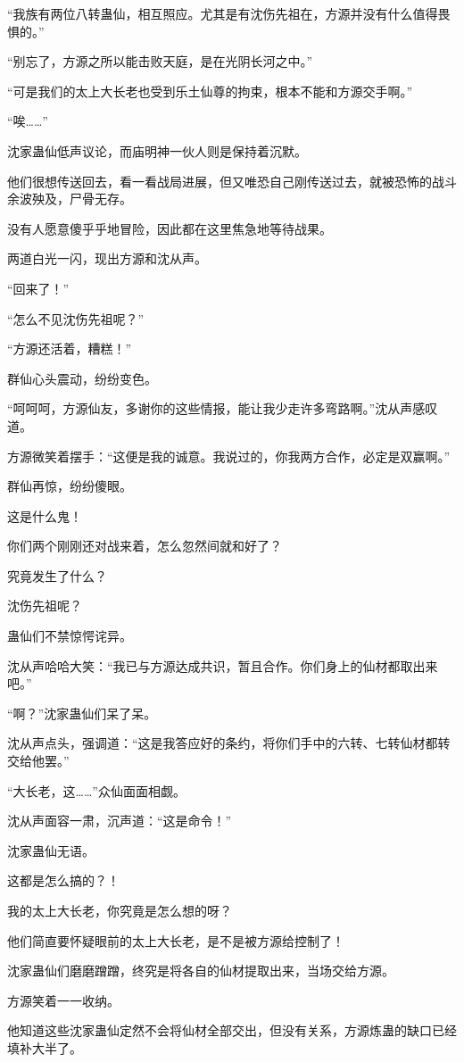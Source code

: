 \begin{this_body}
“我族有两位八转蛊仙，相互照应。尤其是有沈伤先祖在，方源并没有什么值得畏惧的。”

“别忘了，方源之所以能击败天庭，是在光阴长河之中。”

“可是我们的太上大长老也受到乐土仙尊的拘束，根本不能和方源交手啊。”

“唉……”

沈家蛊仙低声议论，而庙明神一伙人则是保持着沉默。

他们很想传送回去，看一看战局进展，但又唯恐自己刚传送过去，就被恐怖的战斗余波殃及，尸骨无存。

没有人愿意傻乎乎地冒险，因此都在这里焦急地等待战果。

两道白光一闪，现出方源和沈从声。

“回来了！”

“怎么不见沈伤先祖呢？”

“方源还活着，糟糕！”

群仙心头震动，纷纷变色。

“呵呵呵，方源仙友，多谢你的这些情报，能让我少走许多弯路啊。”沈从声感叹道。

方源微笑着摆手：“这便是我的诚意。我说过的，你我两方合作，必定是双赢啊。”

群仙再惊，纷纷傻眼。

这是什么鬼！

你们两个刚刚还对战来着，怎么忽然间就和好了？

究竟发生了什么？

沈伤先祖呢？

蛊仙们不禁惊愕诧异。

沈从声哈哈大笑：“我已与方源达成共识，暂且合作。你们身上的仙材都取出来吧。”

“啊？”沈家蛊仙们呆了呆。

沈从声点头，强调道：“这是我答应好的条约，将你们手中的六转、七转仙材都转交给他罢。”

“大长老，这……”众仙面面相觑。

沈从声面容一肃，沉声道：“这是命令！”

沈家蛊仙无语。

这都是怎么搞的？！

我的太上大长老，你究竟是怎么想的呀？

他们简直要怀疑眼前的太上大长老，是不是被方源给控制了！

沈家蛊仙们磨磨蹭蹭，终究是将各自的仙材提取出来，当场交给方源。

方源笑着一一收纳。

他知道这些沈家蛊仙定然不会将仙材全部交出，但没有关系，方源炼蛊的缺口已经填补大半了。


\end{this_body}
